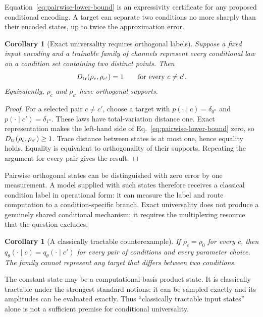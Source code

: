 \documentclass[11pt]{article}
\newtheorem{corollary}[theorem]{Corollary}
\theoremstyle{definition}
\theoremstyle{remark}
\begin{document}
Equation~\eqref{eq:pairwise-lower-bound} is an expressivity certificate for
any proposed conditional encoding.  A target can separate two conditions no
more sharply than their encoded states, up to twice the approximation error.

\begin{corollary}[Exact universality requires orthogonal labels]
\label{cor:orthogonal}
Suppose a fixed input encoding and a trainable family of channels represent
every conditional law on a condition set containing two distinct points.
Then
\begin{equation}
  D_{\rm tr}(\rho_c,\rho_{c'})=1
  \qquad\text{for every }c\neq c'.
  \label{eq:orthogonal-necessary}
\end{equation}
Equivalently, $\rho_c$ and $\rho_{c'}$ have orthogonal supports.
\end{corollary}

\begin{proof}
For a selected pair $c\neq c'$, choose a target with
$p(\cdot\mid c)=\delta_{0^n}$ and
$p(\cdot\mid c')=\delta_{1^n}$.  These laws have total-variation distance
one.  Exact representation makes the left-hand side of
Eq.~\eqref{eq:pairwise-lower-bound} zero, so
$D_{\rm tr}(\rho_c,\rho_{c'})\geq1$.  Trace distance between states is at most
one, hence equality holds.  Equality is equivalent to orthogonality of their
supports.  Repeating the argument for every pair gives the result.
\end{proof}

Pairwise orthogonal states can be distinguished with zero error by one
measurement.  A model supplied with such states therefore receives a
classical condition label in operational form: it can measure the label and
route computation to a condition-specific branch.  Exact universality does
not produce a genuinely shared conditional mechanism; it requires the
multiplexing resource that the question excludes.

\begin{corollary}[A classically tractable counterexample]
If $\rho_c=\rho_0$ for every $c$, then
$q_\theta(\cdot\mid c)=q_\theta(\cdot\mid c')$ for every pair of conditions
and every parameter choice.  The family cannot represent any target that
differs between two conditions.
\end{corollary}

The constant state may be a computational-basis product state.  It is
classically tractable under the strongest standard notions: it can be sampled
exactly and its amplitudes can be evaluated exactly.  Thus ``classically
tractable input states'' alone is not a sufficient premise for conditional
universality.
\end{document}
